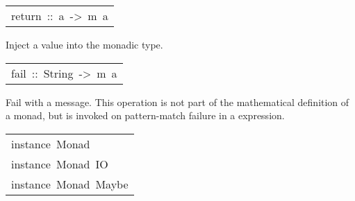 \begin{haddockdesc}
\begin{haddockdesc}
\end{haddockdesc}
\begin{haddockdesc}
\item[\begin{tabular}{@{}l}
return\ ::\ a\ ->\ m\ a
\end{tabular}]\haddockbegindoc
Inject a value into the monadic type.
\par

\end{haddockdesc}
\begin{haddockdesc}
\item[\begin{tabular}{@{}l}
fail\ ::\ String\ ->\ m\ a
\end{tabular}]\haddockbegindoc
Fail with a message.  This operation is not part of the
 mathematical definition of a monad, but is invoked on pattern-match
 failure in a  expression.
\par

\end{haddockdesc}
\end{haddockdesc}
\begin{haddockdesc}
\item[\begin{tabular}{@{}l}
instance\ Monad\ {\char 91}{\char 93}\\instance\ Monad\ IO\\instance\ Monad\ Maybe
\end{tabular}]
\end{haddockdesc}
